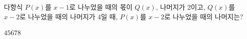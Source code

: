 다항식 $P(x)$를 $x-1$로 나누었을 때의 몫이 $Q(x)$, 나머지가 2이고, $Q(x)$를 $x-2$로 나누었을 때의 나머지가 4일 때, $P(x)$를 $x-2$로 나누었을 때의 나머지는?
\begin{choices32}{$4$}{$5$}{$6$}{$7$}{$8$}\end{choices32}
